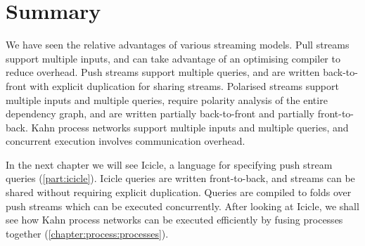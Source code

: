 

\newpage

\section{Summary}
We have seen the relative advantages of various streaming models.
Pull streams support multiple inputs, and can take advantage of an optimising compiler to reduce overhead.
Push streams support multiple queries, and are written back-to-front with explicit duplication for sharing streams.
Polarised streams support multiple inputs and multiple queries, require polarity analysis of the entire dependency graph, and are written partially back-to-front and partially front-to-back.
Kahn process networks support multiple inputs and multiple queries, and concurrent execution involves communication overhead.

In the next chapter we will see Icicle, a language for specifying push stream queries (\cref{part:icicle}).
Icicle queries are written front-to-back, and streams can be shared without requiring explicit duplication.
Queries are compiled to folds over push streams which can be executed concurrently.
After looking at Icicle, we shall see how Kahn process networks can be executed efficiently by fusing processes together (\cref{chapter:process:processes}).

